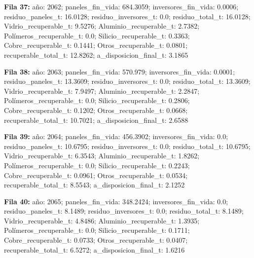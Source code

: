 {\footnotesize\textbf{Fila 37:} año: 2062; paneles\_fin\_vida: 684.3059; inversores\_fin\_vida: 0.0006; residuo\_paneles\_t: 16.0128; residuo\_inversores\_t: 0.0; residuo\_total\_t: 16.0128; Vidrio\_recuperable\_t: 9.5276; Aluminio\_recuperable\_t: 2.7382; Polímeros\_recuperable\_t: 0.0; Silicio\_recuperable\_t: 0.3363; Cobre\_recuperable\_t: 0.1441; Otros\_recuperable\_t: 0.0801; recuperable\_total\_t: 12.8262; a\_disposicion\_final\_t: 3.1865\par}
{\footnotesize\textbf{Fila 38:} año: 2063; paneles\_fin\_vida: 570.979; inversores\_fin\_vida: 0.0001; residuo\_paneles\_t: 13.3609; residuo\_inversores\_t: 0.0; residuo\_total\_t: 13.3609; Vidrio\_recuperable\_t: 7.9497; Aluminio\_recuperable\_t: 2.2847; Polímeros\_recuperable\_t: 0.0; Silicio\_recuperable\_t: 0.2806; Cobre\_recuperable\_t: 0.1202; Otros\_recuperable\_t: 0.0668; recuperable\_total\_t: 10.7021; a\_disposicion\_final\_t: 2.6588\par}
{\footnotesize\textbf{Fila 39:} año: 2064; paneles\_fin\_vida: 456.3902; inversores\_fin\_vida: 0.0; residuo\_paneles\_t: 10.6795; residuo\_inversores\_t: 0.0; residuo\_total\_t: 10.6795; Vidrio\_recuperable\_t: 6.3543; Aluminio\_recuperable\_t: 1.8262; Polímeros\_recuperable\_t: 0.0; Silicio\_recuperable\_t: 0.2243; Cobre\_recuperable\_t: 0.0961; Otros\_recuperable\_t: 0.0534; recuperable\_total\_t: 8.5543; a\_disposicion\_final\_t: 2.1252\par}
{\footnotesize\textbf{Fila 40:} año: 2065; paneles\_fin\_vida: 348.2424; inversores\_fin\_vida: 0.0; residuo\_paneles\_t: 8.1489; residuo\_inversores\_t: 0.0; residuo\_total\_t: 8.1489; Vidrio\_recuperable\_t: 4.8486; Aluminio\_recuperable\_t: 1.3935; Polímeros\_recuperable\_t: 0.0; Silicio\_recuperable\_t: 0.1711; Cobre\_recuperable\_t: 0.0733; Otros\_recuperable\_t: 0.0407; recuperable\_total\_t: 6.5272; a\_disposicion\_final\_t: 1.6216\par}
